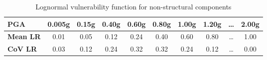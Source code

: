 \begin{table}[htbp]

\centering
\begin{tabular}{ l c c c c c c c c c }

\hline
\rowcolor{anti-flashwhite}
\bf{PGA} & \bf{0.005g} & \bf{0.15g} & \bf{0.40g} & \bf{0.60g} & \bf{0.80g} & \bf{1.00g} & \bf{1.20g} & \bf{\dots} & \bf{2.00g} \\
\hline
\bf{Mean LR} & 0.01 & 0.05 & 0.12 & 0.24 & 0.40 & 0.60 & 0.80 & \dots & 1.00 \\
\bf{CoV LR} & 0.03 & 0.12 & 0.24 & 0.32 & 0.32 & 0.24 & 0.12 & \dots & 0.00 \\
\hline
\end{tabular}

\caption{Lognormal vulnerability function for non-structural components}
\label{tab:vf-ln-tax1-nst}
\end{table}